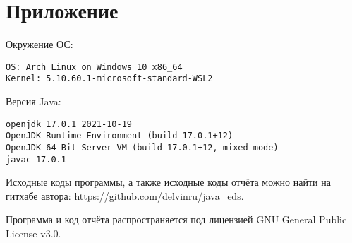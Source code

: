 \section{Приложение}

Окружение ОС:
\begin{verbatim}
OS: Arch Linux on Windows 10 x86_64
Kernel: 5.10.60.1-microsoft-standard-WSL2
\end{verbatim}

Версия Java:
\begin{verbatim}
openjdk 17.0.1 2021-10-19
OpenJDK Runtime Environment (build 17.0.1+12)
OpenJDK 64-Bit Server VM (build 17.0.1+12, mixed mode)
javac 17.0.1
\end{verbatim}

Исходные коды программы, а также исходные коды отчёта можно найти на гитхабе автора: \url{https://github.com/delvinru/java_eds}.

Программа и код отчёта распространяется под лицензией GNU General Public License v3.0.